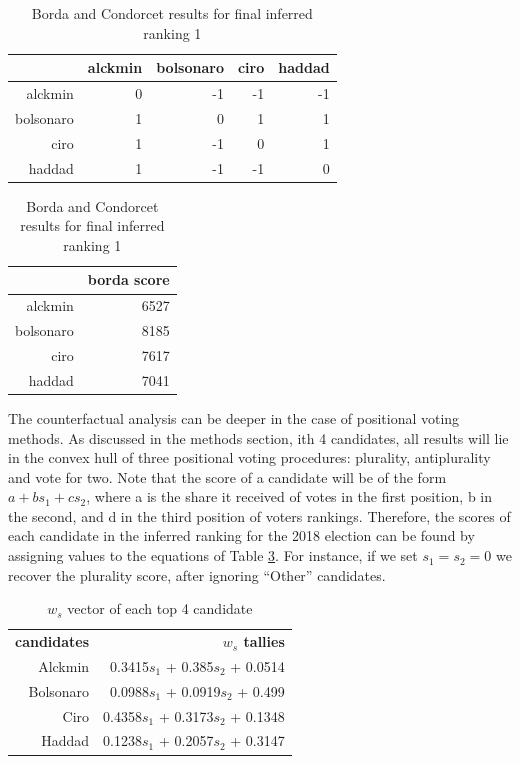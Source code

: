 \documentclass[hidelinks,11pt]{article}
\begin{document}
\begin{table}[h]
\begin{subtable}[h]{0.4\textwidth}
\centering
\begin{tabular}{rrrrr}
  \hline
 & alckmin & bolsonaro & ciro & haddad \\
  \hline
alckmin & 0 & -1 & -1 & -1 \\
  bolsonaro & 1 & 0 & 1 & 1 \\
  ciro & 1 & -1 & 0 & 1 \\
  haddad & 1 & -1 & -1 & 0 \\
   \hline
\end{tabular}
\caption{Pairwise Majority Comparisons}
\label{tbl:subtab1}
\end{subtable}
\hfill
\begin{subtable}[h]{0.4\textwidth}
  \centering
\begin{tabular}{rr}
  \hline
 & borda score \\
  \hline
alckmin & 6527 \\
  bolsonaro & 8185 \\
  ciro & 7617 \\
  haddad & 7041 \\
   \hline
\end{tabular}
\caption{Borda scores}
\label{tbl:subtab2}
\end{subtable}
\caption{Borda and Condorcet results for final inferred ranking 1}
\label{tbl:tab1}
\end{table}


The counterfactual analysis can be deeper in the case of positional voting
methods. As discussed in the methods section, ith 4 candidates, all results will
lie in the convex hull of three positional voting procedures: plurality,
antiplurality and vote for two. Note that the score of a candidate will be of the
form \(a + bs_{1} + cs_{2}\), where a is the share it received of votes in the
first position, b in the second, and d in the third position of voters rankings.
Therefore, the scores of each candidate in the inferred ranking for the 2018
election can be found by assigning values to the equations of Table
\ref{tab:ws}. For instance, if we set \(s_{1} = s_{2} = 0\) we recover the
plurality score, after ignoring ``Other'' candidates.

\begin{table}
  \centering
  \begin{tabular}{rr}
    \hline\hline
    \textbf{candidates} & \textbf{\(w_s\) tallies} \\
    Alckmin & 0.3415\(s_1\) + 0.385\(s_2\) + 0.0514 \\
    Bolsonaro & 0.0988\(s_1\) + 0.0919\(s_2\) + 0.499 \\
    Ciro & 0.4358\(s_1\) + 0.3173\(s_2\) + 0.1348 \\
    Haddad & 0.1238\(s_1\) + 0.2057\(s_2\) + 0.3147 \\\hline\hline
  \end{tabular}
  \caption{\(w_{s}\) vector of each top 4 candidate}
  \label{tab:ws}
\end{table}
\end{document}
